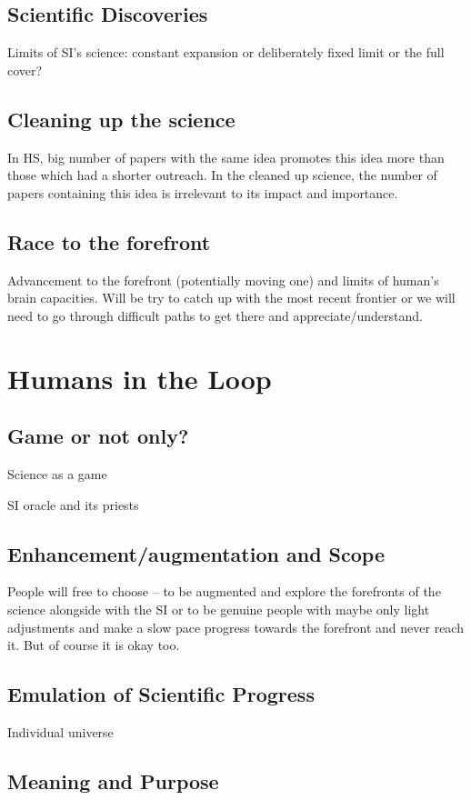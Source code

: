 \documentclass[a4paper,11pt]{article}
\begin{document}
        \subsection{Scientific Discoveries}

        Limits of SI's science: constant expansion or deliberately fixed limit or the full cover?

        \subsection{Cleaning up the science}

        In HS, big number of papers with the same idea promotes this idea more than those which had a shorter outreach. In the cleaned up science, the number of papers containing this idea is irrelevant to its impact and importance. 

        \subsection{Race to the forefront}

        Advancement to the forefront (potentially moving one) and limits of human's brain capacities. Will be try to catch up with the most recent frontier or we will need to go through difficult paths to get there and appreciate/understand.

    \section{Humans in the Loop}

        \subsection{Game or not only?}

        Science as a game

        SI oracle and its priests

        \subsection{Enhancement/augmentation and Scope}






        People will free to choose -- to be augmented and explore the forefronts of the science alongside with the SI or to be genuine people with maybe only light adjustments and make a slow pace progress towards the forefront and never reach it. But of course it is okay too.

        \subsection{Emulation of Scientific Progress}

        Individual universe

        \subsection{Meaning and Purpose}






\printbibliography
\end{document}

